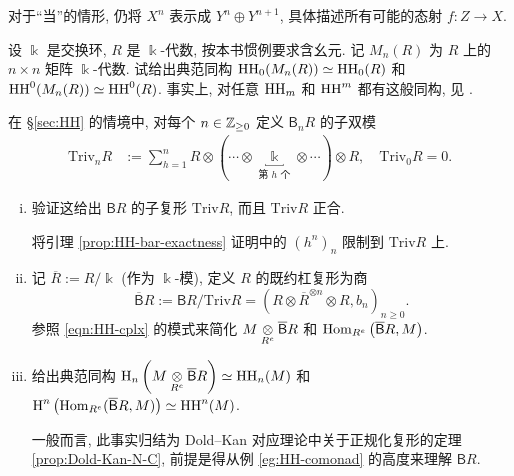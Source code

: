 \begin{Exercises}
\begin{hint}
		对于``当''的情形, 仍将 $X^n$ 表示成 $Y^n \oplus Y^{n+1}$, 具体描述所有可能的态射 $f: Z \to X$.
	\end{hint}

	\item 设 $\Bbbk$ 是交换环, $R$ 是 $\Bbbk$-代数, 按本书惯例要求含幺元. 记 $M_n(R)$ 为 $R$ 上的 $n \times n$ 矩阵 $\Bbbk$-代数. 试给出典范同构 $\operatorname{HH}_0(M_n(R)) \simeq \operatorname{HH}_0(R)$ 和 $\operatorname{HH}^0(M_n(R)) \simeq \operatorname{HH}^0(R)$. 事实上, 对任意 $\operatorname{HH}_m$ 和 $\operatorname{HH}^m$ 都有这般同构, 见 \cite[Theorem 1.2.4]{Lo98}.

	\item 在 \S\ref{sec:HH} 的情境中, 对每个 $n \in \mathbb{Z}_{\geq 0}$ 定义 $\mathsf{B}_n R$ 的子双模
	\begin{align*}
		\mathrm{Triv}_n R & := \sum_{h=1}^n R \otimes ( \cdots \otimes \underbracket{\;\Bbbk\;}_{\text{第 $h$ 个}} \otimes \cdots ) \otimes R, \quad \mathrm{Triv}_0 R = 0.
	\end{align*}
	\begin{enumerate}[(i)]
		\item 验证这给出 $\mathsf{B} R$ 的子复形 $\mathrm{Triv} R$, 而且 $\mathrm{Triv} R$ 正合.
		\begin{hint}
			将引理 \ref{prop:HH-bar-exactness} 证明中的 $(h^n)_n$ 限制到 $\mathrm{Triv} R$ 上.
		\end{hint}
		\item 记 $\overline{R} := R/\Bbbk$ (作为 $\Bbbk$-模), 定义 $R$ 的既约杠复形为商
			\[ \overline{\mathsf{B}} R := \mathsf{B} R / \mathrm{Triv} R = \left( R \otimes \overline{R}^{\otimes n} \otimes R, b_n \right)_{n \geq 0}. \]
			参照 \eqref{eqn:HH-cplx} 的模式来简化 $M \underset{R^e}{\otimes} \overline{\mathsf{B}} R$ 和 $\operatorname{Hom}_{R^e}\left(\overline{\mathsf{B}} R, M \right)$.
		\item 给出典范同构 $\operatorname{H}_n\left( M \underset{R^e}{\otimes} \overline{\mathsf{B}} R \right) \simeq \operatorname{HH}_n(M)$ 和 $\operatorname{H}^n\left( \operatorname{Hom}_{R^e}(\overline{\mathsf{B}} R, M) \right) \simeq \operatorname{HH}^n(M)$.
		\begin{hint}
			一般而言, 此事实归结为 Dold--Kan 对应理论中关于正规化复形的定理 \ref{prop:Dold-Kan-N-C}, 前提是得从例 \ref{eg:HH-comonad} 的高度来理解 $\mathsf{B}R$.
		\end{hint}
	\end{enumerate}


\end{Exercises}
